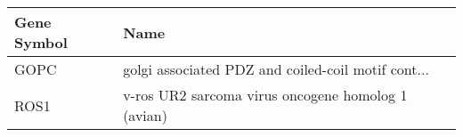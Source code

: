 \begin{tabular}{ll}
\toprule
Gene Symbol &                                               Name \\
\midrule
       GOPC & golgi associated PDZ and coiled-coil motif cont... \\
       ROS1 & v-ros UR2 sarcoma virus oncogene homolog 1 (avian) \\
\bottomrule
\end{tabular}

